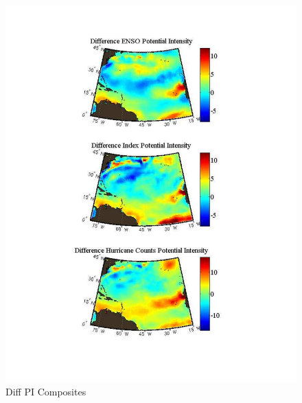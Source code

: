 \documentclass[a4paper,10pt]{article}
\begin{document}
\begin{figure}[ht]
\begin{minipage}[b]{0.6\linewidth}
\includegraphics[width=\textwidth]{figs/sensitivityResults/compositeMaps/diffPIAtlanticComposites.pdf}
\caption{Diff PI Composites}
\label{fig:figure22}
\end{minipage}
\end{figure}
\end{document}
